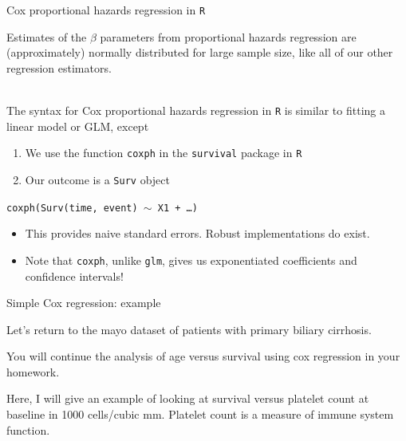 \documentclass[10pt,t]{beamer}
\begin{document}
\begin{frame}{Cox proportional hazards regression in \texttt{R}}
	
	\vspace{-5 mm}
	
	
	Estimates of the $\beta$ parameters from proportional hazards regression are (approximately) normally distributed for large sample size, like all of our other regression estimators.
	\\ ~\ 

	The syntax for Cox proportional hazards regression in \texttt{R} is similar to fitting a linear model or GLM, except
	
	\medskip
	\begin{enumerate}
		\item We use the function \texttt{coxph} in the \texttt{survival} package in \texttt{R}
		
		\medskip
		
		\item Our outcome is a \texttt{Surv} object
	\end{enumerate}
	\begin{center}
		\texttt{coxph(Surv(time, event) $\sim$ X1 + \dots)}
	\end{center}
	\begin{itemize}
	\item This provides naive standard errors. Robust implementations do exist.
	
	\medskip
	\item Note that \texttt{coxph}, unlike \texttt{glm}, gives us exponentiated coefficients and confidence intervals! 
\end{itemize}
\end{frame}

\begin{frame}{Simple Cox regression: example}
	
	Let's return to the mayo dataset of patients with primary biliary cirrhosis.
	
	\bigskip
	
	You will continue the analysis of age versus survival using cox regression in your homework. 
	
	\bigskip
	
	Here, I will give an example of looking at survival versus platelet count at baseline in 1000 cells/cubic mm. Platelet count is a measure of immune system function. 
	
	\end{frame}
\end{document}

